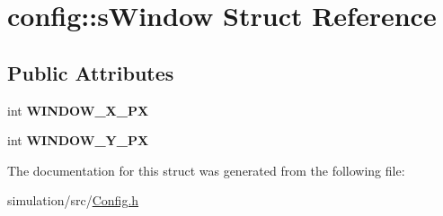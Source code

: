\hypertarget{structconfig_1_1s_window}{}\section{config\+:\+:s\+Window Struct Reference}
\label{structconfig_1_1s_window}
\subsection*{Public Attributes}
\begin{DoxyCompactItemize}
\item 
\mbox{\label{structconfig_1_1s_window_aed552708ff733ec85593fd96113552e0}} 
int {\bfseries W\+I\+N\+D\+O\+W\+\_\+\+X\+\_\+\+PX}
\item 
\mbox{\label{structconfig_1_1s_window_ad61587d1e8b181ead0b2bd6b60f81dec}} 
int {\bfseries W\+I\+N\+D\+O\+W\+\_\+\+Y\+\_\+\+PX}
\end{DoxyCompactItemize}


The documentation for this struct was generated from the following file\+:\begin{DoxyCompactItemize}
\item 
simulation/src/\mbox{\hyperlink{_config_8h}{Config.\+h}}\end{DoxyCompactItemize}
